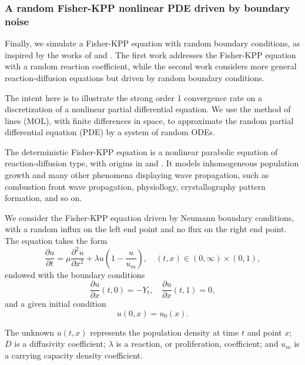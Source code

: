 \documentclass[reqno,12pt]{amsart}
\theoremstyle{plain} %
\theoremstyle{definition} %
\begin{document}
\subsubsection{A random Fisher-KPP nonlinear PDE driven by boundary noise}

Finally, we simulate a Fisher-KPP equation with random boundary conditions, as inspired by the works of \cite{SalakoShen2020}  and \cite{FreidlinWentzell1992}. The first work addresses the Fisher-KPP equation with a random reaction coefficient, while the second work considers more general reaction-diffusion equations but driven by random boundary conditions.

The intent here is to illustrate the strong order 1 convergence rate on a discretization of a nonlinear partial differential equation. We use the method of lines (MOL), with finite differences in space, to approximate the random partial differential equation (PDE) by a system of random ODEs.

The deterministic Fisher-KPP equation is a nonlinear parabolic equation of react\-ion-diffusion type, with origins in \cite{Fisher1937} and \cite{KPP1937}. It models inhomogeneous population growth and many other phenomena displaying wave propagation, such as combustion front wave propagation, physiollogy, crystallography pattern formation, and so on.

We consider the Fisher-KPP equation driven by Neumann boundary conditions, with a random influx on the left end point and no flux on the right end point. The equation takes the form
\begin{equation}
    \label{fisherkpprode}
    \frac{\partial u}{\displaystyle \partial t} = \mu\frac{\partial^2 u}{\partial x^2} + \lambda u\left(1 - \frac{u}{u_m}\right), \quad (t, x) \in (0, \infty) \times (0, 1),
\end{equation}
endowed with the boundary conditions
\begin{equation}
    \label{fisherkppbc}
    \frac{\partial u}{\partial x}(t, 0) = - Y_t, \quad \frac{\partial u}{\partial x}(t, 1) = 0,
\end{equation}
and a given initial condition
\[
   u(0, x) = u_0(x).
\]

The unknown $u(t, x)$ represents the population density at time $t$ and point $x$; $D$ is a diffusivity coefficient; $\lambda$ is a reaction, or proliferation, coefficient; and $u_m$ is a carrying capacity density coefficient.
\end{document}
